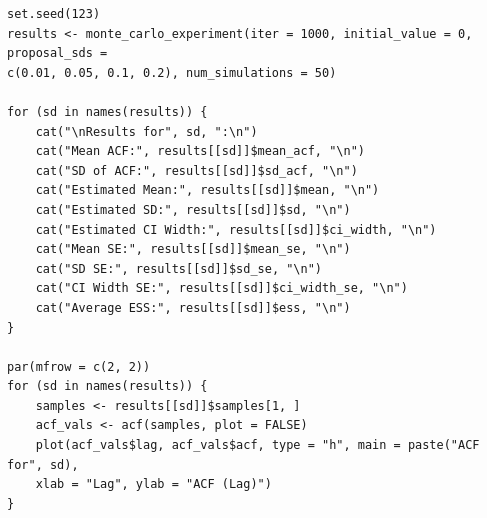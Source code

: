 \documentclass[12pt]{article}
\begin{document}
\begin{lstlisting}
set.seed(123)
results <- monte_carlo_experiment(iter = 1000, initial_value = 0, proposal_sds = 
c(0.01, 0.05, 0.1, 0.2), num_simulations = 50)

for (sd in names(results)) {
	cat("\nResults for", sd, ":\n")
	cat("Mean ACF:", results[[sd]]$mean_acf, "\n")
	cat("SD of ACF:", results[[sd]]$sd_acf, "\n")
	cat("Estimated Mean:", results[[sd]]$mean, "\n")
	cat("Estimated SD:", results[[sd]]$sd, "\n")
	cat("Estimated CI Width:", results[[sd]]$ci_width, "\n")
	cat("Mean SE:", results[[sd]]$mean_se, "\n")
	cat("SD SE:", results[[sd]]$sd_se, "\n")
	cat("CI Width SE:", results[[sd]]$ci_width_se, "\n")
	cat("Average ESS:", results[[sd]]$ess, "\n")
}

par(mfrow = c(2, 2)) 
for (sd in names(results)) {
	samples <- results[[sd]]$samples[1, ]
	acf_vals <- acf(samples, plot = FALSE)
	plot(acf_vals$lag, acf_vals$acf, type = "h", main = paste("ACF for", sd), 
	xlab = "Lag", ylab = "ACF (Lag)")
}

\end{lstlisting}
\end{document}
